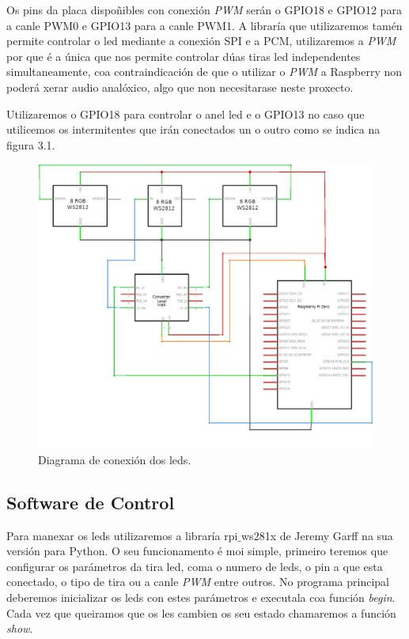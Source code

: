 Os pins da placa dispoñibles con conexión \emph{PWM} serán o GPIO18 e GPIO12 para a canle PWM0 e GPIO13 para a canle PWM1. A libraría que utilizaremos tamén permite controlar o led mediante a conexión SPI e a PCM, utilizaremos a \emph{PWM} por que é a única que nos permite controlar dúas tiras led independentes simultaneamente, coa contraindicación de que o utilizar o \emph{PWM} a Raspberry non poderá xerar audio analóxico, algo que non necesitarase neste proxecto.

Utilizaremos o GPIO18 para controlar o anel led e o GPIO13 no caso que utilicemos os intermitentes que irán conectados un o outro como se indica na figura 3.1.

\begin{figure}[tb]
  \centering
  \includegraphics[scale=1]{imaxes/circuito-leds.png}
  \caption{Diagrama de conexión dos leds.}
  \label{f:conexións cos leds}
\end{figure}

\subsection{Software de Control}
Para manexar os leds utilizaremos a libraría rpi\(\_\)ws281x de Jeremy Garff na sua versión para Python. O seu funcionamento é moi simple, primeiro teremos que configurar os parámetros da tira led, coma o numero de leds, o pin a que esta conectado, o tipo de tira  ou a canle \emph{PWM} entre outros. No programa principal deberemos inicializar os leds con estes parámetros e executala coa función \emph{begin}. Cada vez que queiramos que os les cambien os seu estado chamaremos a función \emph{show}.

